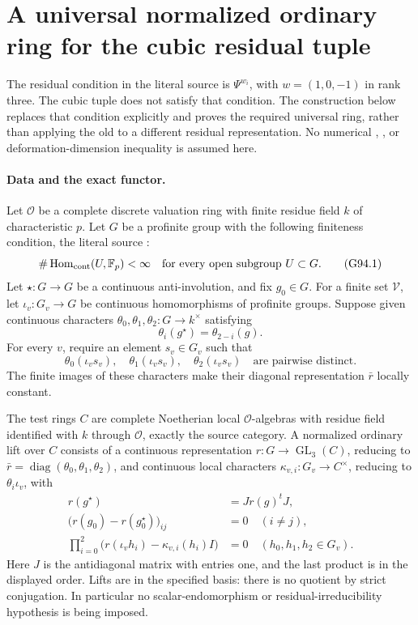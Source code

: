 \section{A universal normalized ordinary ring for the cubic residual tuple}
\label{sec:cubic-residual-tuple-space}

The residual condition in the literal source  is
\(\Psi^{w_i}\), with \(w=(1,0,-1)\) in rank three.
The cubic tuple does not satisfy that condition.  The construction
below replaces that condition explicitly and proves the required
universal ring, rather than applying the old  to a
different residual representation.  No numerical ,
, or deformation-dimension inequality is assumed here.

\paragraph{Data and the exact functor.}
Let \(\mathcal O\) be a complete discrete valuation ring with
finite residue field \(k\) of characteristic \(p\).
Let \(G\) be a profinite group with the following finiteness
condition, the literal source :
\[
 \#\operatorname{Hom}_{\rm cont}(U,\mathbb F_p)<\infty
 \quad\text{for every open subgroup }U\subset G.
 \tag{G94.1}
\]
Let \(\star:G\to G\) be a continuous anti-involution, and
fix \(g_0\in G\).  For a finite set \(\mathcal V\), let
\(\iota_v:G_v\to G\) be continuous homomorphisms of profinite
groups.  Suppose given continuous characters
\(\theta_0,\theta_1,\theta_2:G\to k^\times\) satisfying
\[
 \theta_i(g^\star)=\theta_{2-i}(g).
 \tag{G94.2}
\]
For every \(v\), require an element \(s_v\in G_v\) such that
\[
 \theta_0(\iota_v s_v),\quad
 \theta_1(\iota_v s_v),\quad
 \theta_2(\iota_v s_v)
 \quad\text{are pairwise distinct}.
 \tag{G94.3}
\]
The finite images of these characters make their diagonal
representation \(\bar r\) locally constant.

The test rings \(C\) are complete Noetherian local
\(\mathcal O\)-algebras with residue field identified with
\(k\) through \(\mathcal O\), exactly the source
 category.  A normalized ordinary lift over
\(C\) consists of a continuous representation
\(r:G\to\operatorname{GL}_3(C)\), reducing to
\(\bar r=\operatorname{diag}(\theta_0,\theta_1,\theta_2)\),
and continuous local characters
\(\kappa_{v,i}:G_v\to C^\times\), reducing to
\(\theta_i\iota_v\), with
\[
 \begin{split}
 r(g^\star)&=Jr(g)^tJ,\\
 \bigl(r(g_0)-r(g_0^\star)\bigr)_{ij}&=0\quad(i\ne j),\\
 \prod_{i=0}^{2}
   \bigl(r(\iota_v h_i)-\kappa_{v,i}(h_i)I\bigr)&=0
       \quad(h_0,h_1,h_2\in G_v).
 \end{split}
 \tag{G94.4}
\]
Here \(J\) is the antidiagonal matrix with entries one, and
the last product is in the displayed order.  Lifts are in the
specified basis: there is no quotient by strict conjugation.
In particular no scalar-endomorphism or residual-irreducibility
hypothesis is being imposed.

